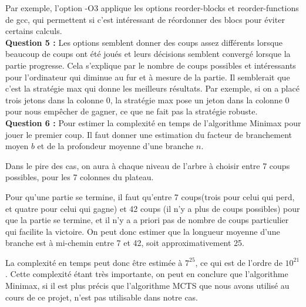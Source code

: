 \documentclass[a4paper, 11pt]{article}
\begin{document}
Par exemple, l'option -O3 applique les options reorder-blocks et reorder-functions de gcc, qui permettent si c'est intéressant de réordonner des blocs pour éviter certains calculs.\\

\textbf{Question 5 : } Les options semblent donner des coups assez différents lorsque beaucoup de coups ont été joués et leurs décisions semblent convergé lorsque la partie progresse. Cela s'explique par le nombre de coups possibles et intéressants pour l'ordinateur qui diminue au fur et à mesure de la partie. Il semblerait que c'est la stratégie max qui donne les meilleurs résultats. Par exemple, si on a placé trois jetons dans la colonne 0, la stratégie max pose un jeton dans la colonne 0 pour nous empêcher de gagner, ce que ne fait pas la stratégie robuste.\\


\textbf{Question 6 : } Pour estimer la complexité en temps de l'algorithme Minimax pour jouer le premier coup. Il faut donner une estimation du facteur de branchement moyen $b$ et de la profondeur moyenne d'une branche $n$.

Dans le pire des cas, on aura à chaque niveau de l'arbre à choisir entre 7 coups possibles, pour les 7 colonnes du plateau.

Pour qu'une partie se termine, il faut qu'entre 7 coups(trois pour celui qui perd, et quatre pour celui qui gagne) et 42 coups (il n'y a plus de coups possibles) pour que la partie se termine, et il n'y a a priori pas de nombre de coups particulier qui facilite la victoire. On peut donc estimer que la longueur moyenne d'une branche est à mi-chemin entre 7 et 42, soit approximativement 25.

La complexité en temps peut donc être estimée à $7^{25}$, ce qui est de l'ordre de $10^{21}$. Cette complexité étant très importante, on peut en conclure que l'algorithme Minimax, si il est plus précis que l'algorithme MCTS que nous avons utilisé au cours de ce projet, n'est pas utilisable dans notre cas. 
\end{document}

